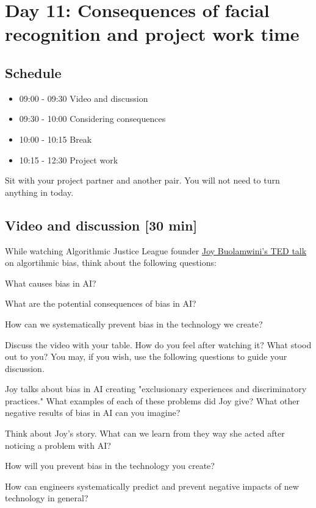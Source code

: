 \chapter{Day 11: Consequences of facial recognition and project work time}

\section{Schedule}
\begin{itemize}
\item 09:00 - 09:30			Video and discussion
\item 09:30 - 10:00		Considering consequences
\item 10:00 - 10:15		Break
\item 10:15 - 12:30		Project work
\end{itemize}

Sit with your project partner and another pair. You will not need to turn anything in today.

\section{Video and discussion [30 min]}

While watching Algorithmic Justice League founder \href{https://www.ted.com/talks/joy_buolamwini_how_i_m_fighting_bias_in_algorithms#t-459194}{Joy Buolamwini's TED talk} on algortihmic bias, think about the following questions:%
\be
\item What causes bias in AI?
\item What are the potential consequences of bias in AI?
\item How can we systematically prevent bias in the technology we create?
\ee

Discuss the video with your table. How do you feel after watching it? What stood out to you? You may, if you wish, use the following questions to guide your discussion.
\be

\item Joy talks about bias in AI creating "exclusionary experiences and discriminatory practices." What examples of each of these problems did Joy give? What other negative results of bias in AI can you imagine?
\item Think about Joy's story. What can we learn from they way she acted after noticing a problem with AI?
\item How will you prevent bias in the technology you create?
\item How can engineers systematically predict and prevent negative impacts of new technology in general?
\ee

